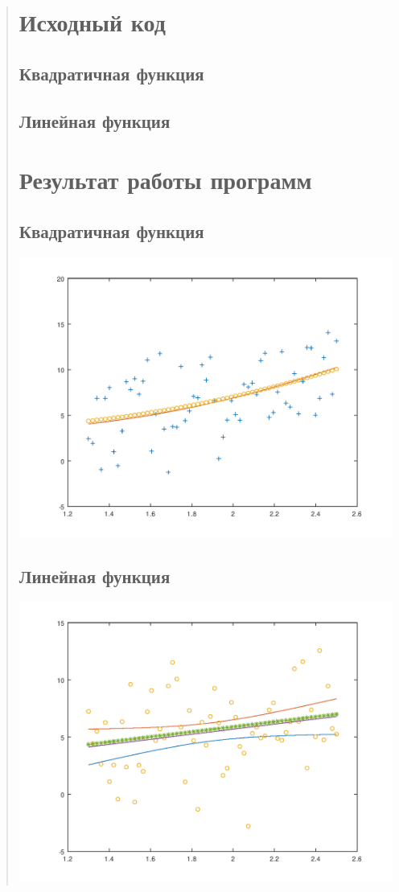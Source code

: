\documentclass{article}
\begin{document}
\begin{quote}
\section{Исходный код}
\subsection{Квадратичная функция}
  
\subsection{Линейная функция}
  
\section{Результат работы программ}
\subsection{Квадратичная функция}
  
  \includegraphics[scale=0.9]{g1.png}
\subsection{Линейная функция}
  
  \includegraphics[scale=0.9]{g2.png}

\end{quote}
\end{document}

